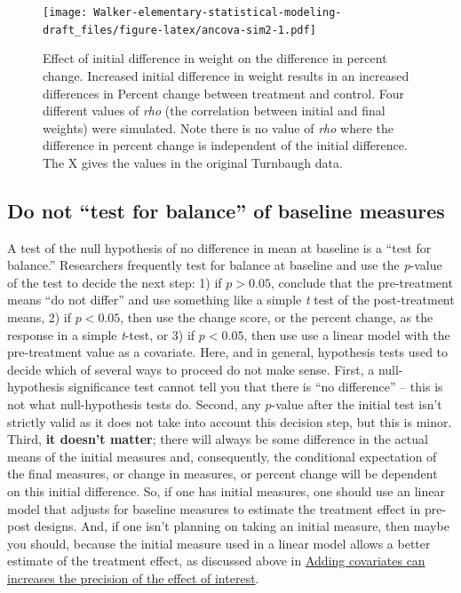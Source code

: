 \documentclass[]{book}
\begin{document}
\begin{figure}
\centering
\texttt{[image: Walker-elementary-statistical-modeling-draft\_files/figure-latex/ancova-sim2-1.pdf]}
\caption{\label{fig:ancova-sim2}Effect of initial difference in weight on the difference in percent change. Increased initial difference in weight results in an increased differences in Percent change between treatment and control. Four different values of \emph{rho} (the correlation between initial and final weights) were simulated. Note there is no value of \emph{rho} where the difference in percent change is independent of the initial difference. The X gives the values in the original Turnbaugh data.}
\end{figure}

\hypertarget{do-not-test-for-balance-of-baseline-measures}{%
\subsection{Do not ``test for balance'' of baseline measures}\label{do-not-test-for-balance-of-baseline-measures}}

A test of the null hypothesis of no difference in mean at baseline is a ``test for balance.'' Researchers frequently test for balance at baseline and use the \emph{p}-value of the test to decide the next step: 1) if \(p > 0.05\), conclude that the pre-treatment means ``do not differ'' and use something like a simple \emph{t} test of the post-treatment means, 2) if \(p < 0.05\), then use the change score, or the percent change, as the response in a simple \emph{t}-test, or 3) if \(p < 0.05\), then use use a linear model with the pre-treatment value as a covariate. Here, and in general, hypothesis tests used to decide which of several ways to proceed do not make sense. First, a null-hypothesis significance test cannot tell you that there is ``no difference'' -- this is not what null-hypothesis tests do. Second, any \(p\)-value after the initial test isn't strictly valid as it does not take into account this decision step, but this is minor. Third, \textbf{it doesn't matter}; there will always be some difference in the actual means of the initial measures and, consequently, the conditional expectation of the final measures, or change in measures, or percent change will be dependent on this initial difference. So, if one has initial measures, one should use an linear model that adjusts for baseline measures to estimate the treatment effect in pre-post designs. And, if one isn't planning on taking an initial measure, then maybe you should, because the initial measure used in a linear model allows a better estimate of the treatment effect, as discussed above in \protect\hyperlink{adding-covariates-can-increases-the-precision-of-the-effect-of-interest}{Adding covariates can increases the precision of the effect of interest}.
\end{document}

